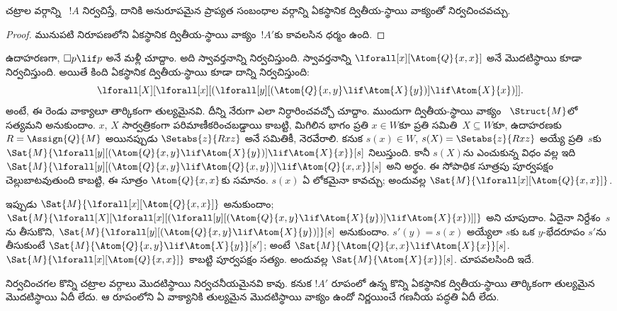 \documentclass[../../../include/open-logic-section]{subfiles}
\begin{document}
\begin{cor}
  చట్రాల వర్గాన్ని ~$!A$
  నిర్వచిస్తే, దానికి అనురూపమైన ప్రాప్యత సంబంధాల
  వర్గాన్ని ఏకస్థానిక ద్వితీయ-స్థాయి వాక్యంతో
  నిర్వచించవచ్చు.
\end{cor}

\begin{proof}
  మునుపటి నిరూపణలోని ఏకస్థానిక ద్వితీయ-స్థాయి
  వాక్యం~$!A'$కు కావలసిన ధర్మం ఉంది.
\end{proof}

ఉదాహరణగా, $\Box p \lif p$ అనే
 మళ్లీ చూద్దాం. అది
స్వావర్తనాన్ని నిర్వచిస్తుంది. స్వావర్తనాన్ని
$\lforall[x][\Atom{Q}{x,x}]$ అనే
మొదటిస్థాయి  కూడా
నిర్వచిస్తుంది. అయితే కింది ఏకస్థానిక ద్వితీయ-స్థాయి
 కూడా దాన్ని నిర్వచిస్తుంది:
\[
\lforall[X][\lforall[x][(\lforall[y][(\Atom{Q}{x,y} \lif \Atom{X}{y})]
    \lif \Atom{X}{x})]].
\]
అంటే, ఈ రెండు వాక్యాలూ తార్కికంగా తుల్యమైనవి. దీన్ని నేరుగా
ఎలా నిర్ధారించవచ్చో చూద్దాం. ముందుగా ద్వితీయ-స్థాయి
వాక్యం ~$\Struct{M}$లో
సత్యమని అనుకుందాం. $x$, $X$ సార్వత్రికంగా
పరిమాణీకరించబడ్డాయి కాబట్టి, మిగిలిన భాగం ప్రతి
$x \in W$కూ ప్రతి సమితి~$X \subseteq W$కూ, ఉదాహరణకు
$R = \Assign{Q}{M}$ అయినప్పుడు
$\Setabs{z}{Rxz}$ అనే సమితికీ, నెరవేరాలి. కనుక
$s(x) \in W$, $s(X) = \Setabs{z}{Rxz}$ అయ్యే
ప్రతి~$s$కు
$\Sat{M}{\lforall[y][(\Atom{Q}{x,y} \lif
    \Atom{X}{y})] \lif \Atom{X}{x}}[s]$ నిలుస్తుంది.
కానీ $s(X)$ను ఎంచుకున్న విధం వల్ల ఇది
$\Sat{M}{\lforall[y][(\Atom{Q}{x,y} \lif
    \Atom{Q}{x,y})] \lif \Atom{Q}{x,x}}[s]$
అని అర్థం. ఈ సోపాధిక సూత్రపు పూర్వపక్షం
చెల్లుబాటవుతుంది కాబట్టి, ఈ సూత్రం
$\Atom{Q}{x,x}$కు సమానం. $s(x)$ ఏ లోకమైనా కావచ్చు;
అందువల్ల $\Sat{M}{\lforall[x][\Atom{Q}{x,x}]}$.

ఇప్పుడు $\Sat{M}{\lforall[x][\Atom{Q}{x,x}]}$
అనుకుందాం; $\Sat{M}{\lforall[X][\lforall[x][(\lforall[y][(\Atom{Q}{x,y} \lif
        \Atom{X}{y})] \lif \Atom{X}{x})]]}$ అని చూపుదాం.
ఏదైనా నిర్దేశం~$s$ను తీసుకొని,
$\Sat{M}{\lforall[y][(\Atom{Q}{x,y} \lif
    \Atom{X}{y})]}[s]$ అనుకుందాం. $s'(y)
= s(x)$ అయ్యేలా $s$కు ఒక $y$-భేదరూపం $s'$ను
తీసుకుంటే $\Sat{M}{\Atom{Q}{x,y} \lif \Atom{X}{y}}[s']$;
అంటే $\Sat{M}{\Atom{Q}{x,x} \lif \Atom{X}{x}}[s]$.
$\Sat{M}{\lforall[x][\Atom{Q}{x,x}]}$ కాబట్టి
పూర్వపక్షం సత్యం. అందువల్ల
$\Sat{M}{\Atom{X}{x}}[s]$. చూపవలసింది ఇదే.

నిర్వచించగల కొన్ని చట్రాల వర్గాలు మొదటిస్థాయి
నిర్వచనీయమైనవి కావు. కనుక $!A'$ రూపంలో ఉన్న
కొన్ని ఏకస్థానిక ద్వితీయ-స్థాయి
 తార్కికంగా తుల్యమైన
మొదటిస్థాయి  ఏదీ లేదు.
ఆ రూపంలోని ఏ వాక్యానికి తుల్యమైన మొదటిస్థాయి వాక్యం ఉందో
నిర్ణయించే గణనీయ పద్ధతి ఏదీ లేదు.
\end{document}
